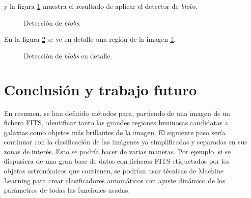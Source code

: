 \documentclass[a4paper,12pt]{article}
\begin{document}

y la figura \ref{fig:img5} muestra el resultado de aplicar el detector de \textit{blobs}.
\begin{figure}[h!]
\centering
{}
\caption{Detección de \textit{blobs}.}
\label{fig:img5}
\end{figure}

En la figura \ref{fig:img6} se ve en detalle una región de la imagen \ref{fig:img5}.
\begin{figure}[h!]
\centering
{}
\caption{Detección de \textit{blobs} en detalle.}
\label{fig:img6}
\end{figure}

\section{Conclusión y trabajo futuro}
En resumen, se han definido métodos para, partiendo de una imagen de un fichero FITS, identificar tanto las grandes regiones luminosas candidatas a galaxias como objetos más brillantes de la imagen. El siguiente paso sería continuar con la clasificación de las imágenes ya simplificadas y separadas en sus zonas de interés. Esto se podría hacer de varias maneras. Por ejemplo, si se dispusiera de una gran base de datos con ficheros FITS etiquetados por los objetos astronómicos que contienen, se podrían usar técnicas de Machine Learning para crear clasificadores automáticos con ajuste dinámico de los parámetros de todas las funciones usadas.
\end{document}
